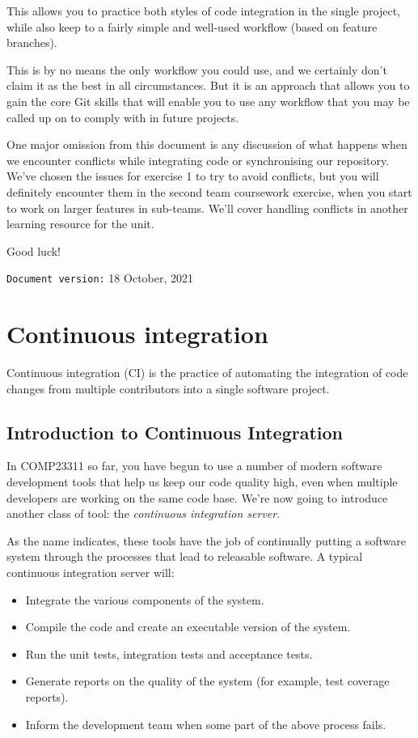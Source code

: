 \documentclass[
]{book}
\providecommand{\tightlist}{%
  \setlength{\itemsep}{0pt}\setlength{\parskip}{0pt}}
\begin{document}
This allows you to practice both styles of code integration in the single project, while also keep to a fairly simple and well-used workflow (based on feature branches).

This is by no means the only workflow you could use, and we certainly don't claim it as the best in all circumstances. But it is an approach that allows you to gain the core Git skills that will enable you to use any workflow that you may be called up on to comply with in future projects.

One major omission from this document is any discussion of what happens when we encounter conflicts while integrating code or synchronising our repository. We've chosen the issues for exercise 1 to try to avoid conflicts, but you will definitely encounter them in the second team coursework exercise, when you start to work on larger features in sub-teams. We'll cover handling conflicts in another learning resource for the unit.

Good luck!

\texttt{Document\ version:} 18 October, 2021

\hypertarget{integrating}{%
\chapter{Continuous integration}\label{integrating}}

Continuous integration (CI) is the practice of automating the integration of code changes from multiple contributors into a single software project.

\hypertarget{ici}{%
\section{Introduction to Continuous Integration}\label{ici}}

In COMP23311 so far, you have begun to use a number of modern software development tools that help us keep our code quality high, even when multiple developers are working on the same code base. We're now going to introduce another class of tool: the \emph{continuous integration server}.

As the name indicates, these tools have the job of continually putting a software system through the processes that lead to releasable software. A typical continuous integration server will:

\begin{itemize}
\tightlist
\item
  Integrate the various components of the system.
\item
  Compile the code and create an executable version of the system.
\item
  Run the unit tests, integration tests and acceptance tests.
\item
  Generate reports on the quality of the system (for example, test coverage reports).
\item
  Inform the development team when some part of the above process fails.
\end{itemize}
\end{document}
